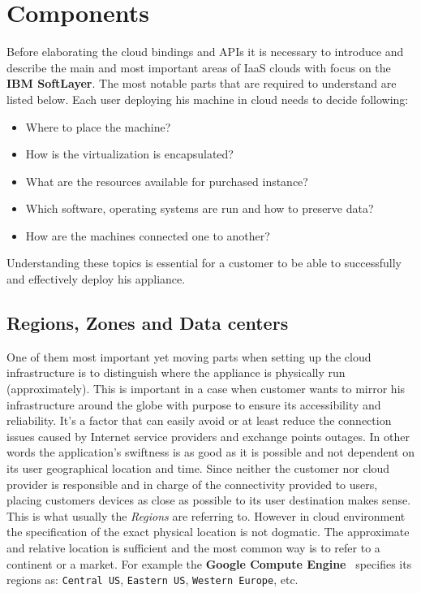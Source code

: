 \section{Components}
\label{sec:Components}

Before elaborating the cloud bindings and APIs it is necessary to introduce and describe the main and most important areas of IaaS clouds with focus on the \textbf{IBM SoftLayer}. The most notable parts that are required to understand are listed below. Each user deploying his machine in cloud needs to decide following:

\begin{itemize}
	\item Where to place the machine?
	\item How is the virtualization is encapsulated?
	\item What are the resources available for purchased instance?
	\item Which software, operating systems are run and how to preserve data?
	\item How are the machines connected one to another?
\end{itemize}

Understanding these topics is essential for a customer to be able to successfully and effectively deploy his appliance.

\subsection{Regions, Zones and Data centers}
\label{sub:Regions, Zones and Data centers}

One of them most important yet moving parts when setting up the cloud infrastructure is to distinguish where the appliance is physically run (approximately). This is important in a case when customer wants to mirror his infrastructure around the globe with purpose to ensure its accessibility and reliability. It's a factor that can easily avoid or at least reduce the connection issues caused by Internet service providers and exchange points outages. In other words the application's swiftness is as good as it is possible and not dependent on its user geographical location and time. Since neither the customer nor cloud provider is responsible and in charge of the connectivity provided to users, placing customers devices as close as possible to its user destination makes sense. This is what usually the \emph{Regions} are referring to. However in cloud environment the specification of the exact physical location is not dogmatic. The approximate and relative location is sufficient and the most common way is to refer to a continent or a market. For example the \textbf{Google Compute Engine}~\cite{gce} specifies its regions as: \texttt{Central US}, \texttt{Eastern US}, \texttt{Western Europe}, etc.

